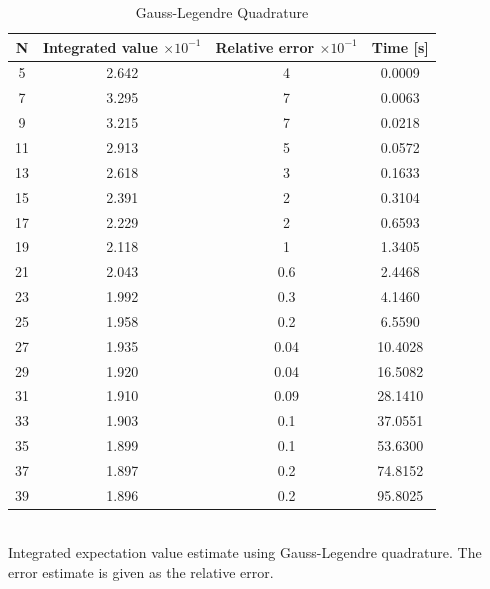 \documentclass[%
reprint,
amsmath,amssymb,
aps,
]{revtex4-1}
\begin{document}
\begin{table}[!h]
	\caption {Gauss-Legendre Quadrature} 
	\begin{tabular}{|c|c|c|c|}
		\hline 
		\hspace{5mm} \textbf{N} \hspace{5mm} & \textbf{Integrated value $\times 10^{-1}$} & \hspace{3mm}\textbf{Relative error $\times 10^{-1}$} & \hspace{3mm}\textbf{Time  [s]} \hspace{5mm}\\
		\hline 
			5 & 2.642  & 4  & 0.0009 \\
			7 & 3.295  & 7  & 0.0063 \\
			9 & 3.215  & 7  & 0.0218 \\
			11 & 2.913  & 5  & 0.0572 \\
			13 & 2.618  & 3  & 0.1633 \\
			15 & 2.391  & 2  & 0.3104 \\
			17 & 2.229  & 2  & 0.6593 \\
			19 & 2.118  & 1  & 1.3405 \\
			21 & 2.043  & 0.6  & 2.4468 \\
			23 & 1.992  & 0.3  & 4.1460 \\
			25 & 1.958  & 0.2  & 6.5590 \\
			27 & 1.935  & 0.04  & 10.4028 \\
			29 & 1.920  & 0.04  & 16.5082 \\
			31 & 1.910  & 0.09  & 28.1410 \\
			33 & 1.903  & 0.1  & 37.0551 \\
			35 & 1.899  & 0.1  & 53.6300 \\
			37 & 1.897  & 0.2  & 74.8152 \\
			39 & 1.896  & 0.2  & 95.8025 \\

		\hline 
	\end{tabular} \\ [5pt]
	\label{legendre_values} \centering  Integrated expectation value estimate using Gauss-Legendre quadrature. The error estimate is given as the relative error.
\end{table}
\end{document}
